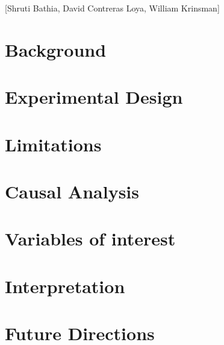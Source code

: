 \documentclass[oneside, notitlepage]{book}
\begin{document}
[Shruti Bathia, David Contreras Loya, William Krinsman]

\section{Background}
\label{cha:backgr-quest-quest}



\section{Experimental Design}
\label{cha:data-exper-descr}



\section{Limitations}
\label{sec:antic-chall}



\section{Causal Analysis}
\label{sec:caus-analys-exper}



\section{Variables of interest}
\label{sec:variables-interest}



\section{Interpretation}
\label{sec:interpretation}



\section{Future Directions}
\label{sec:future-directions}
\end{document}
